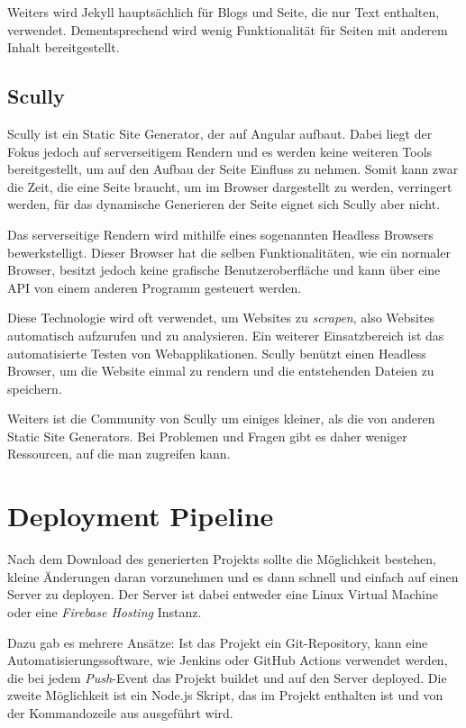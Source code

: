 Weiters wird Jekyll hauptsächlich für Blogs und Seite, die nur Text enthalten, verwendet.
Dementsprechend wird wenig Funktionalität für Seiten mit anderem Inhalt bereitgestellt.

\subsection{Scully}
Scully ist ein Static Site Generator, der auf Angular aufbaut.
Dabei liegt der Fokus jedoch auf serverseitigem Rendern und es werden keine weiteren Tools bereitgestellt, um auf
den Aufbau der Seite Einfluss zu nehmen.
Somit kann zwar die Zeit, die eine Seite braucht, um im Browser dargestellt zu werden, verringert werden, für das
dynamische Generieren der Seite eignet sich Scully aber nicht.

Das serverseitige Rendern wird mithilfe eines sogenannten Headless Browsers bewerkstelligt.
Dieser Browser hat die selben Funktionalitäten, wie ein normaler Browser, besitzt jedoch keine grafische
Benutzeroberfläche und kann über eine API von einem anderen Programm gesteuert werden.

Diese Technologie wird oft verwendet, um Websites zu \textit{scrapen}, also Websites automatisch aufzurufen
und zu analysieren.
Ein weiterer Einsatzbereich ist das automatisierte Testen von Webapplikationen.
Scully benützt einen Headless Browser, um die Website einmal zu rendern und die entstehenden Dateien zu speichern.

Weiters ist die Community von Scully um einiges kleiner, als die von anderen Static Site Generators.
Bei Problemen und Fragen gibt es daher weniger Ressourcen, auf die man zugreifen kann.

\section{Deployment Pipeline}
Nach dem Download des generierten Projekts sollte die Möglichkeit bestehen,
kleine Änderungen daran vorzunehmen und es dann schnell und einfach auf einen
Server zu deployen.
Der Server ist dabei entweder eine Linux Virtual Machine oder eine \textit{Firebase Hosting} Instanz.

Dazu gab es mehrere Ansätze: Ist das Projekt ein Git-Repository, kann eine
Automatisierungssoftware, wie Jenkins oder GitHub Actions verwendet werden,
die bei jedem \textit{Push}-Event das Projekt buildet und auf den Server
deployed.
 Die zweite Möglichkeit ist ein Node.js Skript, das im Projekt enthalten ist und von der Kommandozeile
 aus ausgeführt wird.


